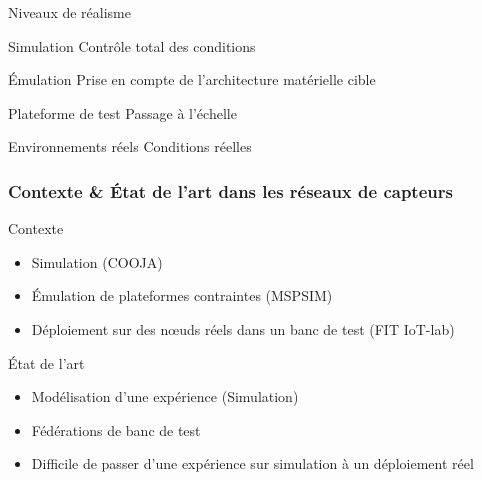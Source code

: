\begin{frame}{Niveaux de réalisme}
  \begin{block}{Simulation}
   Contrôle total des conditions
  \end{block}
  \begin{block}{Émulation}
    Prise en compte de l'architecture matérielle cible
  \end{block}
  \begin{block}{Plateforme de test}
   Passage à l'échelle
  \end{block}
  \begin{block}{Environnements réels}
    Conditions réelles
  \end{block}

\end{frame}

\begin{frame}\frametitle{Contexte \& État de l'art dans les réseaux de capteurs}

  \begin{block}{Contexte}
    \begin{itemize}
      \item Simulation (COOJA)
      \item Émulation de plateformes contraintes (MSPSIM)
      \item Déploiement sur des nœuds réels dans un banc de test (FIT IoT-lab)
    \end{itemize}
  \end{block}

  \begin{block}{État de l'art}
    \begin{itemize}
      \item Modélisation d'une expérience (Simulation)
      \item Fédérations de banc de test
      \item Difficile de passer d'une expérience sur simulation à un déploiement réel
    \end{itemize}
  \end{block}


\end{frame}

